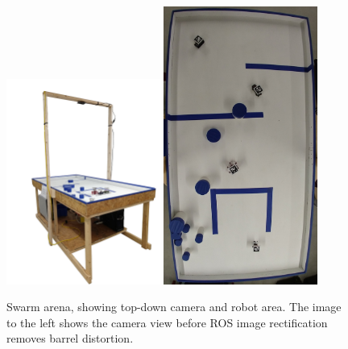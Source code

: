 \begin{figure}
	\centering
	\includegraphics[width=0.45\textwidth]{../swarm_table_no_bg_small}
	\includegraphics[width=0.45\textwidth]{../overhead_view}
	\caption{Swarm arena, showing top-down camera and robot area. The image to the left shows the camera view before ROS image rectification removes barrel distortion.} 
	\label{fig:robot_arena}
\end{figure}


